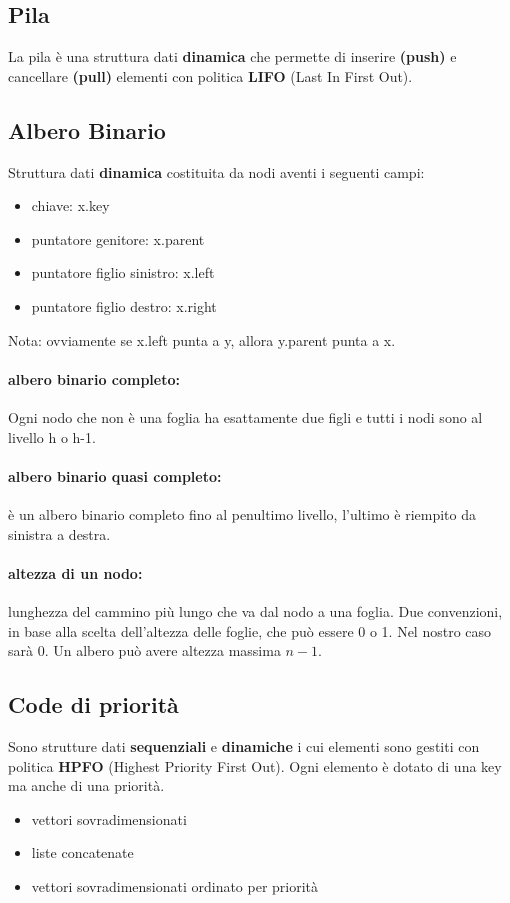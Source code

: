 \documentclass{article}
\begin{document}
\subsection{Pila} %
La pila è una struttura dati \textbf{dinamica} che permette di inserire \textbf{(push)} e cancellare \textbf{(pull)}
 elementi con politica \textbf{LIFO} (Last In First Out).

\subsection{Albero Binario} %
Struttura dati \textbf{dinamica} costituita da nodi aventi i seguenti campi:
\begin{itemize}
    \item chiave: x.key
    \item puntatore genitore: x.parent
    \item puntatore figlio sinistro: x.left
    \item puntatore figlio destro: x.right
\end{itemize}
Nota: ovviamente se x.left punta a y, allora y.parent punta a x. 

\paragraph{albero binario completo:} Ogni nodo che non è una foglia ha esattamente due figli e tutti i 
nodi sono al livello h o h-1.

\paragraph{albero binario quasi completo:} è un albero binario completo fino al penultimo livello, l'ultimo è 
riempito da sinistra a destra.

\paragraph{altezza di un nodo:} lunghezza del cammino più lungo che va dal nodo a una foglia. Due convenzioni, in base
alla scelta dell'altezza delle foglie, che può essere 0 o 1. Nel nostro caso sarà 0. 
Un albero può avere altezza massima $n-1$.

\subsection{Code di priorità} %
Sono strutture dati \textbf{sequenziali} e \textbf{dinamiche} i cui elementi sono gestiti con politica \textbf{HPFO} (Highest Priority First Out).
 Ogni elemento è dotato di una key ma anche di una priorità.
\begin{itemize}
    \item vettori sovradimensionati
    \item liste concatenate
    \item vettori sovradimensionati ordinato per priorità
\end{itemize}
\end{document}
